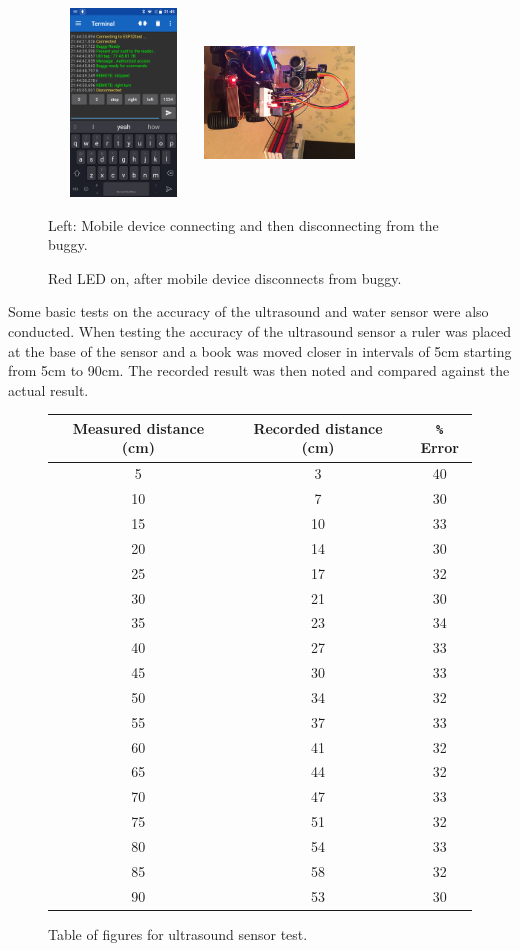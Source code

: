 \documentclass[8pt, a4paper]{article}
\begin{document}
\begin{figure}[H]
	\centering
	\includegraphics[height=5.0cm, width=4.0cm]{red_led_disconnect}
	\includegraphics[height=5.0cm, width=4.0cm, angle=90, origin=c]{red_led}
	\caption{Left: Mobile device connecting and then disconnecting from the buggy.}
	\caption{Red LED on, after mobile device disconnects from buggy.}
\end{figure} 

Some basic tests on the accuracy of the ultrasound and water sensor were also conducted. When testing the accuracy of the ultrasound sensor a ruler was placed at the base of the sensor and a book was moved closer in intervals of 5cm starting from 5cm to 90cm. The recorded result was then noted and compared against the actual result. 


\begin{figure}[H]
	\centering
	\begin{tabular}{|c|c|c|}
		\hline
		Measured distance (cm) & Recorded distance (cm) & \verb|%| Error\\
		\hline
		 5 & 3 & 40 \\   
		 10 & 7 & 30\\
		 15 & 10 & 33 \\
		 20 & 14 & 30\\
		 25 & 17 & 32\\
		 30 & 21 & 30\\
		 35 & 23 & 34\\
		 40 & 27 & 33\\
		 45 & 30 & 33\\
		 50 & 34 & 32\\
		 55 & 37 & 33\\
		 60 & 41 & 32\\
		 65 & 44 & 32\\
 		 70 & 47 & 33\\
		 75 & 51 & 32\\
		 80 & 54 & 33\\
		 85 & 58 & 32\\
		 90 & 53 & 30\\
		\hline
	\end{tabular}
	\caption{Table of figures for ultrasound sensor test.}
\end{figure}
\end{document}
